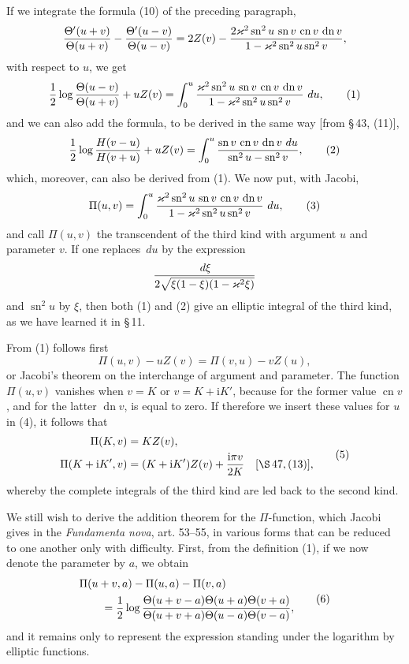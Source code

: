 \documentclass[11pt]{article}
\providecommand{\dd}{\,d}
\providecommand{\sn}{\operatorname{sn}}
\providecommand{\cn}{\operatorname{cn}}
\providecommand{\dn}{\operatorname{dn}}
\providecommand{\ii}{\mathrm{i}}
\begin{document}
If we integrate the formula (10) of the preceding paragraph,
\[
{\Theta'(u+v)\over\Theta(u+v)}-{\Theta'(u-v)\over\Theta(u-v)}
=2Z(v)-{2\varkappa^2\sn^2u\,\sn v\,\cn v\,\dn v\over1-\varkappa^2\sn^2u\sn^2v},
\]
with respect to $u$, we get
\begin{equation}
{1\over2}\log{\Theta(u-v)\over\Theta(u+v)}+uZ(v)
=\int_0^u {\varkappa^2\sn^2u\,\sn v\,\cn v\,\dn v\over1-\varkappa^2\sn^2u\sn^2v}\,\dd u,
\tag{1}
\end{equation}
and we can also add the formula, to be derived in the same way [from \S\,43, (11)],
\begin{equation}
{1\over2}\log{H(v-u)\over H(v+u)}+uZ(v)
=\int_0^u {\sn v\,\cn v\,\dn v\,\dd u\over\sn^2u-\sn^2v},
\tag{2}
\end{equation}
which, moreover, can also be derived from (1). We now put, with Jacobi,
\begin{equation}
\Pi(u,v)=\int_0^u {\varkappa^2\sn^2u\,\sn v\,\cn v\,\dn v\over1-\varkappa^2\sn^2u\sn^2v}\,\dd u,
\tag{3}
\end{equation}
and call $\Pi(u,v)$ the transcendent of the third kind with argument $u$ and parameter $v$. If one replaces $\dd u$ by the expression
\[
{\dd\xi\over2\sqrt{\xi(1-\xi)(1-\varkappa^2\xi)}}
\]
and $\sn^2u$ by $\xi$, then both (1) and (2) give an elliptic integral of the third kind, as we have learned it in \S\,11.

From (1) follows first
\begin{equation}
\Pi(u,v)-uZ(v)=\Pi(v,u)-vZ(u),
\tag{4}
\end{equation}
or Jacobi's theorem on the interchange of argument and parameter. The function $\Pi(u,v)$ vanishes when $v=K$ or $v=K+\ii K'$, because for the former value $\cn v$, and for the latter $\dn v$, is equal to zero. If therefore we insert these values for $u$ in (4), it follows that
\begin{equation}
\begin{aligned}
\Pi(K,v)&=KZ(v),\\
\Pi(K+\ii K',v)&=(K+\ii K')Z(v)+{\ii\pi v\over2K}\quad[\S\,47,(13)],
\end{aligned}
\tag{5}
\end{equation}
whereby the complete integrals of the third kind are led back to the second kind.

We still wish to derive the addition theorem for the $\Pi$-function, which Jacobi gives in the \emph{Fundamenta nova}, art. 53--55, in various forms that can be reduced to one another only with difficulty. First, from the definition (1), if we now denote the parameter by $a$, we obtain
\begin{equation}
\begin{aligned}
&\Pi(u+v,a)-\Pi(u,a)-\Pi(v,a)\\
&\qquad={1\over2}\log{\Theta(u+v-a)\Theta(u+a)\Theta(v+a)
\over\Theta(u+v+a)\Theta(u-a)\Theta(v-a)},
\end{aligned}
\tag{6}
\end{equation}
and it remains only to represent the expression standing under the logarithm by elliptic functions.
\end{document}
